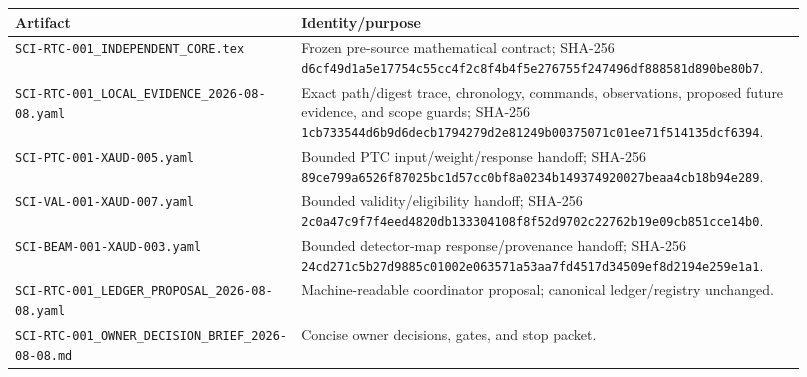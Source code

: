 \documentclass[11pt]{article}
\newcommand{\code}[1]{\nolinkurl{#1}}
\begin{document}
\begin{longtable}{@{}L{0.34\linewidth}L{0.58\linewidth}@{}}
\toprule
Artifact & Identity/purpose \\
\midrule
\endhead
\code{SCI-RTC-001_INDEPENDENT_CORE.tex} & Frozen pre-source mathematical contract; SHA-256 \code{d6cf49d1a5e17754c55cc4f2c8f4b4f5e276755f247496df888581d890be80b7}. \\
\code{SCI-RTC-001_LOCAL_EVIDENCE_2026-08-08.yaml} & Exact path/digest trace, chronology, commands, observations, proposed future evidence, and scope guards; SHA-256 \code{1cb733544d6b9d6decb1794279d2e81249b00375071c01ee71f514135dcf6394}. \\
\code{SCI-PTC-001-XAUD-005.yaml} & Bounded PTC input/weight/response handoff; SHA-256 \code{89ce799a6526f87025bc1d57cc0bf8a0234b149374920027beaa4cb18b94e289}. \\
\code{SCI-VAL-001-XAUD-007.yaml} & Bounded validity/eligibility handoff; SHA-256 \code{2c0a47c9f7f4eed4820db133304108f8f52d9702c22762b19e09cb851cce14b0}. \\
\code{SCI-BEAM-001-XAUD-003.yaml} & Bounded detector-map response/provenance handoff; SHA-256 \code{24cd271c5b27d9885c01002e063571a53aa7fd4517d34509ef8d2194e259e1a1}. \\
\code{SCI-RTC-001_LEDGER_PROPOSAL_2026-08-08.yaml} & Machine-readable coordinator proposal; canonical ledger/registry unchanged. \\
\code{SCI-RTC-001_OWNER_DECISION_BRIEF_2026-08-08.md} & Concise owner decisions, gates, and stop packet. \\
\bottomrule
\end{longtable}
\end{document}

